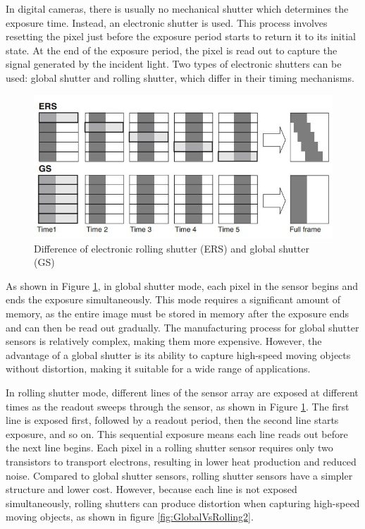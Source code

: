 In digital cameras, there is usually no mechanical shutter which determines the exposure time. Instead, an electronic shutter is used. This process involves resetting the pixel just before the exposure period starts to return it to its initial state. At the end of the exposure period, the pixel is read out to capture the signal generated by the incident light. Two types of electronic shutters can be used: global shutter and rolling shutter, which differ in their timing mechanisms.

\begin{figure}[!h]
     \centering
     \includegraphics[scale =0.8]{Images/4.1_Camera_Selection/GlobalVsRolling.jpg}
     \caption{Difference of electronic rolling shutter (ERS) and global shutter (GS)}
     \label{fig:GlobalVsRolling}
\end{figure}


As shown in Figure \ref{fig:GlobalVsRolling}, in global shutter mode, each pixel in the sensor begins and ends the exposure simultaneously. This mode requires a significant amount of memory, as the entire image must be stored in memory after the exposure ends and can then be read out gradually. The manufacturing process for global shutter sensors is relatively complex, making them more expensive. However, the advantage of a global shutter is its ability to capture high-speed moving objects without distortion, making it suitable for a wide range of applications.

In rolling shutter mode, different lines of the sensor array are exposed at different times as the readout sweeps through the sensor, as shown in Figure \ref{fig:GlobalVsRolling}. The first line is exposed first, followed by a readout period, then the second line starts exposure, and so on. This sequential exposure means each line reads out before the next line begins. Each pixel in a rolling shutter sensor requires only two transistors to transport electrons, resulting in lower heat production and reduced noise. Compared to global shutter sensors, rolling shutter sensors have a simpler structure and lower cost. However, because each line is not exposed simultaneously, rolling shutters can produce distortion when capturing high-speed moving objects, as shown in figure \ref{fig:GlobalVsRolling2}.


